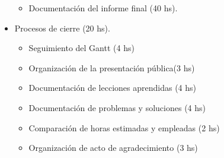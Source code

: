 \begin{itemize}
\begin{itemize}
	\item Documentación del informe final (40 hs).
	\end{itemize}
	\item Procesos de cierre (20 hs).
	\begin{itemize}
	\item Seguimiento del Gantt (4 hs)
	\item Organización de la presentación pública(3 hs)    
	\item Documentación de lecciones aprendidas (4 hs)
	\item Documentación de problemas y soluciones (4 hs)
	\item Comparación de horas estimadas y empleadas (2 hs)
	\item Organización de acto de agradecimiento (3 hs)
	\end{itemize}
\end{itemize}